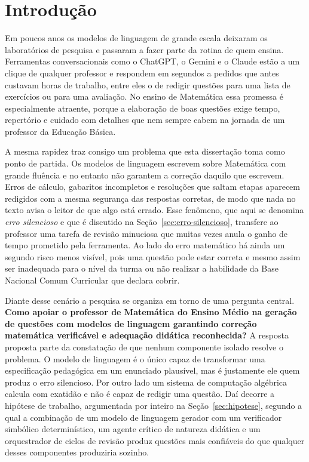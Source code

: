 \chapter*{Introdução}
\label{cap:introducao}


Em poucos anos os modelos de linguagem de grande escala deixaram os laboratórios de pesquisa e
passaram a fazer parte da rotina de quem ensina. Ferramentas conversacionais como o ChatGPT, o
Gemini e o Claude estão a um clique de qualquer professor e respondem em segundos a pedidos que
antes custavam horas de trabalho, entre eles o de redigir questões para uma lista de exercícios
ou para uma avaliação. No ensino de Matemática essa promessa é especialmente atraente, porque a
elaboração de boas questões exige tempo, repertório e cuidado com detalhes que nem sempre cabem
na jornada de um professor da Educação Básica.

A mesma rapidez traz consigo um problema que esta dissertação toma como ponto de partida. Os
modelos de linguagem escrevem sobre Matemática com grande fluência e no entanto não garantem a
correção daquilo que escrevem. Erros de cálculo, gabaritos incompletos e resoluções que saltam
etapas aparecem redigidos com a mesma segurança das respostas corretas, de modo que nada no texto
avisa o leitor de que algo está errado. Esse fenômeno, que aqui se denomina \emph{erro
silencioso} e que é discutido na Seção~\ref{sec:erro-silencioso}, transfere ao professor uma
tarefa de revisão minuciosa que muitas vezes anula o ganho de tempo prometido pela ferramenta. Ao
lado do erro matemático há ainda um segundo risco menos visível, pois uma questão pode estar
correta e mesmo assim ser inadequada para o nível da turma ou não realizar a habilidade da Base
Nacional Comum Curricular que declara cobrir.

Diante desse cenário a pesquisa se organiza em torno de uma pergunta central. \textbf{Como apoiar
o professor de Matemática do Ensino Médio na geração de questões com modelos de linguagem
garantindo correção matemática verificável e adequação didática reconhecida?} A resposta proposta
parte da constatação de que nenhum componente isolado resolve o problema. O modelo de linguagem é
o único capaz de transformar uma especificação pedagógica em um enunciado plausível, mas é
justamente ele quem produz o erro silencioso. Por outro lado um sistema de computação algébrica
calcula com exatidão e não é capaz de redigir uma questão. Daí decorre a hipótese de trabalho,
argumentada por inteiro na Seção~\ref{sec:hipotese}, segundo a qual a combinação de um modelo de
linguagem gerador com um verificador simbólico determinístico, um agente crítico de natureza
didática e um orquestrador de ciclos de revisão produz questões mais confiáveis do que qualquer
desses componentes produziria sozinho.

